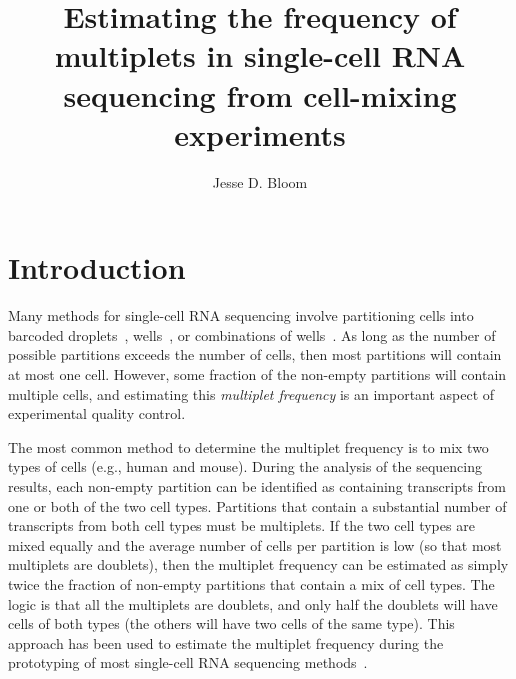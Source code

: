 \documentclass[fleqn,10pt]{wlpeerj} %
\title{Estimating the frequency of multiplets in single-cell RNA sequencing from cell-mixing experiments}
\author[1]{Jesse D. Bloom}
\affil[1]{Fred Hutch Cancer Research Center, Seattle, WA  98109}
\begin{document}
\flushbottom
\maketitle
\thispagestyle{empty}

\section*{Introduction}

Many methods for single-cell RNA sequencing involve partitioning cells into barcoded droplets~\citep{klein2015droplet,macosko2015highly,zheng2017massively}, wells~\citep{gierahn2017seq}, or combinations of wells~\citep{cao2017comprehensive}.
As long as the number of possible partitions exceeds the number of cells, then most partitions will contain at most one cell.
However, some fraction of the non-empty partitions will contain multiple cells, and estimating this \emph{multiplet frequency} is an important aspect of experimental quality control.

The most common method to determine the multiplet frequency is to mix two types of cells (e.g., human and mouse).
During the analysis of the sequencing results, each non-empty partition can be identified as containing transcripts from one or both of the two cell types.
Partitions that contain a substantial number of transcripts from both cell types must be multiplets.
If the two cell types are mixed equally and the average number of cells per partition is low (so that most multiplets are doublets), then the multiplet frequency can be estimated as simply twice the fraction of non-empty partitions that contain a mix of cell types.
The logic is that all the multiplets are doublets, and only half the doublets will have cells of both types (the others will have two cells of the same type).
This approach has been used to estimate the multiplet frequency during the prototyping of most single-cell RNA sequencing methods~\citep{klein2015droplet,macosko2015highly,zheng2017massively,gierahn2017seq,cao2017comprehensive}.
\end{document}
